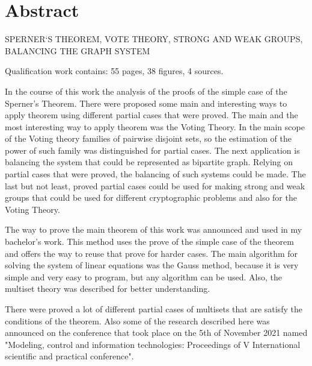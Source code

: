 \chapter*{Abstract}

\MakeUppercase{Sperner`s theorem, vote theory, strong and weak groups, balancing the graph system}

Qualification work contains: 55 pages, 38 figures, 4 sources.

	In the course of this work the analysis of the proofs of the simple case of the Sperner's Theorem. There were proposed some main and interesting ways to apply theorem using different partial cases that were proved. The main and the most interesting way to apply theorem was the Voting Theory. In the main scope of the Voting theory families of pairwise disjoint sets, so the estimation of the power of such family was distinguished for partial cases. The next application is balancing the system that could be represented as bipartite graph. Relying on partial cases that were proved, the balancing of such systems could be made. The last but not least, proved partial cases could be used for making strong and weak groups that could be used for different cryptographic problems and also for the Voting Theory.
	
	The way to prove the main theorem of this work was announced and used in my bachelor's work. This method uses the prove of the simple case of the theorem and offers the way to reuse that prove for harder cases. The main algorithm for solving the system of linear equations was the Gauss method, because it is very simple and very easy to program, but any algorithm can be used. Also, the multiset theory was described for better understanding. 

	There were proved a lot of different partial cases of multisets that are satisfy the conditions of the theorem. Also some of the research described here was announced on the conference that took place on the 5th of November 2021 named "Modeling, control and information technologies: Proceedings of V International scientific and practical conference".